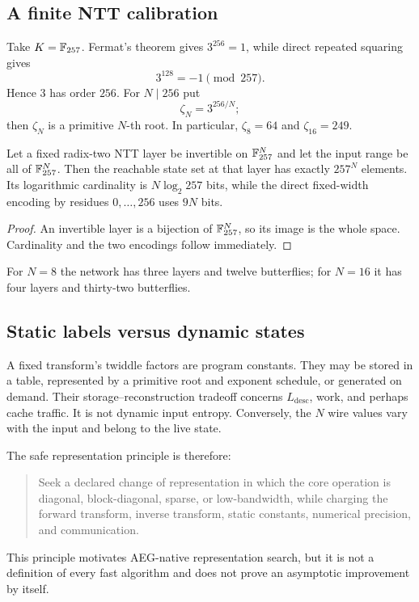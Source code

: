 \subsection{A finite NTT calibration}

Take $K=\mathbb{F}_{257}$.  Fermat's theorem gives $3^{256}=1$, while direct repeated
squaring gives
\[
  3^{128}=-1\pmod{257}.
\]
Hence $3$ has order $256$.  For $N\mid256$ put
\[
  \zeta_N=3^{256/N};
\]
then $\zeta_N$ is a primitive $N$-th root.  In particular,
$\zeta_8=64$ and $\zeta_{16}=249$.

\begin{proposition}
\label{prop:ntt-layer-states}
Let a fixed radix-two NTT layer be invertible on $\mathbb{F}_{257}^N$ and let the input
range be all of $\mathbb{F}_{257}^N$.  Then the reachable state set at that layer has
exactly $257^N$ elements.  Its logarithmic cardinality is
$N\log_2 257$ bits, while the direct fixed-width encoding by residues
$0,\ldots,256$ uses $9N$ bits.
\end{proposition}

\begin{proof}
An invertible layer is a bijection of $\mathbb{F}_{257}^N$, so its image is the whole
space.  Cardinality and the two encodings follow immediately.
\end{proof}

For $N=8$ the network has three layers and twelve butterflies; for $N=16$ it
has four layers and thirty-two butterflies.

\subsection{Static labels versus dynamic states}

A fixed transform's twiddle factors are program constants.  They may be stored
in a table, represented by a primitive root and exponent schedule, or generated
on demand.  Their storage--reconstruction tradeoff concerns
$L_{\mathrm{desc}}$, work, and perhaps cache traffic.  It is not dynamic input
entropy.  Conversely, the $N$ wire values vary with the input and belong to the
live state.

The safe representation principle is therefore:

\begin{quote}
Seek a declared change of representation in which the core operation is
diagonal, block-diagonal, sparse, or low-bandwidth, while charging the forward
transform, inverse transform, static constants, numerical precision, and
communication.
\end{quote}

This principle motivates AEG-native representation search, but it is not a
definition of every fast algorithm and does not prove an asymptotic improvement
by itself.
